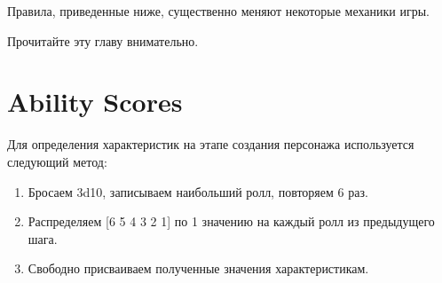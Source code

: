 \documentclass[a4paper,11pt]{book}
\begin{document}
\begin{multicols}{2}
Правила, приведенные ниже, существенно меняют некоторые механики игры.

Прочитайте эту главу внимательно.

\section{Ability Scores}

Для определения характеристик на этапе создания персонажа используется следующий метод:

\begin{enumerate}
    \item Бросаем 3d10, записываем наибольший ролл, повторяем 6 раз.
    \item Распределяем [6 5 4 3 2 1] по 1 значению на каждый ролл из предыдущего шага.
    \item Свободно присваиваем полученные значения характеристикам.
\end{enumerate}

%
%
%


\end{multicols}
\end{document}
